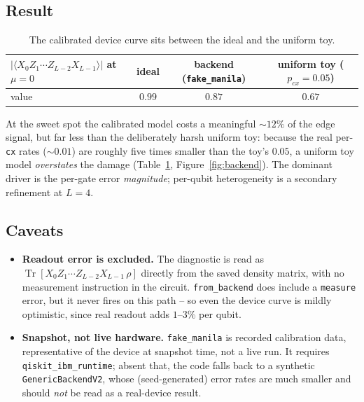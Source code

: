 \documentclass[11pt]{article}
\newcommand{\Oedge}{X_0 Z_1\cdots Z_{L-2} X_{L-1}}
\newcommand{\expv}[1]{\langle #1\rangle}
\newcommand{\Tr}{\operatorname{Tr}}
\newcommand{\cx}{\texttt{cx}}
\begin{document}
\subsection{Result}

\begin{table}[h]
  \centering
  \footnotesize
  \begin{tabular}{lccc}
    \toprule
    $|\expv{\Oedge}|$ at $\mu=0$ & ideal & backend (\texttt{fake\_manila}) & uniform toy ($p_{cx}=0.05$)\\
    \midrule
    value & $0.99$ & $0.87$ & $0.67$\\
    \bottomrule
  \end{tabular}
  \caption{The calibrated device curve sits between the ideal and the uniform toy.}
  \label{tab:backend}
\end{table}

At the sweet spot the calibrated model costs a meaningful $\sim\!12\%$ of the edge
signal, but far less than the deliberately harsh uniform toy: because the real
per-\cx{} rates ($\sim\!0.01$) are roughly five times smaller than the toy's
$0.05$, a uniform toy model \emph{overstates} the damage
(Table~\ref{tab:backend}, Figure~\ref{fig:backend}). The dominant driver is the
per-gate error \emph{magnitude}; per-qubit heterogeneity is a secondary refinement
at $L=4$.

\subsection{Caveats}

\begin{itemize}
  \item \textbf{Readout error is excluded.} The diagnostic is read as
        $\Tr[\Oedge\,\rho]$ directly from the saved density matrix, with no
        measurement instruction in the circuit. \texttt{from\_backend} does include a
        \texttt{measure} error, but it never fires on this path -- so even the device
        curve is mildly optimistic, since real readout adds $1$--$3\%$ per qubit.
  \item \textbf{Snapshot, not live hardware.} \texttt{fake\_manila} is recorded
        calibration data, representative of the device at snapshot time, not a live
        run. It requires \texttt{qiskit\_ibm\_runtime}; absent that, the code falls
        back to a synthetic \texttt{GenericBackendV2}, whose (seed-generated) error
        rates are much smaller and should \emph{not} be read as a real-device result.
\end{itemize}
\end{document}
